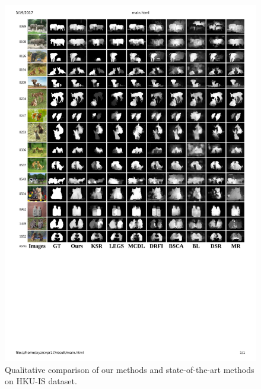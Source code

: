 \documentclass[journal]{IEEEtran}
\begin{document}
\begin{figure}[htbp]
\begin{center}
\includegraphics[width=\linewidth]{cmp_hku.pdf}
\end{center}
\vspace{-10pt}
\caption{Qualitative comparison of our methods and state-of-the-art methods on HKU-IS dataset.}
\label{cmp_hku}
\end{figure}
\end{document}
